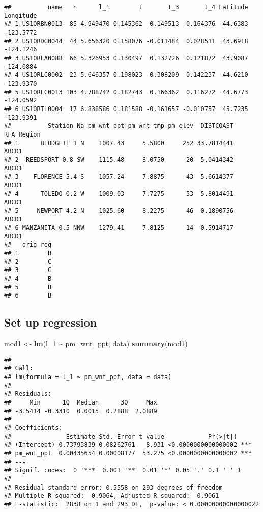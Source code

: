 \documentclass[
]{article}
\newenvironment{Shaded}{\begin{snugshade}}{\end{snugshade}}
\newcommand{\FunctionTok}[1]{\textcolor[rgb]{0.13,0.29,0.53}{\textbf{#1}}}
\newcommand{\NormalTok}[1]{#1}
\newcommand{\OtherTok}[1]{\textcolor[rgb]{0.56,0.35,0.01}{#1}}
\newcommand{\SpecialCharTok}[1]{\textcolor[rgb]{0.81,0.36,0.00}{\textbf{#1}}}
\begin{document}
\begin{verbatim}
##          name   n      l_1        t       t_3       t_4 Latitude Longitude
## 1 US1ORBN0013  85 4.949470 0.145362  0.149513  0.164376  44.6383 -123.5772
## 2 US1ORDG0044  44 5.656320 0.158076 -0.011484  0.028511  43.6918 -124.1246
## 3 US1ORLA0088  66 5.326953 0.130497  0.132726  0.121872  43.9087 -124.0884
## 4 US1ORLC0002  23 5.646357 0.198023  0.308209  0.142237  44.6210 -123.9370
## 5 US1ORLC0013 103 4.788742 0.182743  0.166362  0.116272  44.6773 -124.0592
## 6 US1ORTL0004  17 6.838586 0.181588 -0.161657 -0.010757  45.7235 -123.9391
##          Station_Na pm_wnt_ppt pm_wnt_tmp pm_elev  DISTCOAST RFA_Region
## 1      BLODGETT 1 N    1007.43     5.5800     252 33.7814441      ABCD1
## 2  REEDSPORT 0.8 SW    1115.48     8.0750      20  5.0414342      ABCD1
## 3    FLORENCE 5.4 S    1057.24     7.8875      43  5.6614377      ABCD1
## 4      TOLEDO 0.2 W    1009.03     7.7275      53  5.8014491      ABCD1
## 5     NEWPORT 4.2 N    1025.60     8.2275      46  0.1890756      ABCD1
## 6 MANZANITA 0.5 NNW    1279.41     7.8125      14  0.5914717      ABCD1
##   orig_reg
## 1        B
## 2        C
## 3        C
## 4        B
## 5        B
## 6        B
\end{verbatim}

\subsection{Set up regression}\label{set-up-regression}

\begin{Shaded}
\begin{Highlighting}[]
\NormalTok{mod1 }\OtherTok{\textless{}{-}} \FunctionTok{lm}\NormalTok{(l\_1 }\SpecialCharTok{\textasciitilde{}}\NormalTok{ pm\_wnt\_ppt, data)}
\FunctionTok{summary}\NormalTok{(mod1)}
\end{Highlighting}
\end{Shaded}

\begin{verbatim}
## 
## Call:
## lm(formula = l_1 ~ pm_wnt_ppt, data = data)
## 
## Residuals:
##     Min      1Q  Median      3Q     Max 
## -3.5414 -0.3310  0.0015  0.2888  2.0889 
## 
## Coefficients:
##               Estimate Std. Error t value            Pr(>|t|)    
## (Intercept) 0.73793839 0.08262761   8.931 <0.0000000000000002 ***
## pm_wnt_ppt  0.00435654 0.00008177  53.275 <0.0000000000000002 ***
## ---
## Signif. codes:  0 '***' 0.001 '**' 0.01 '*' 0.05 '.' 0.1 ' ' 1
## 
## Residual standard error: 0.5558 on 293 degrees of freedom
## Multiple R-squared:  0.9064, Adjusted R-squared:  0.9061 
## F-statistic:  2838 on 1 and 293 DF,  p-value: < 0.00000000000000022
\end{verbatim}
\end{document}
